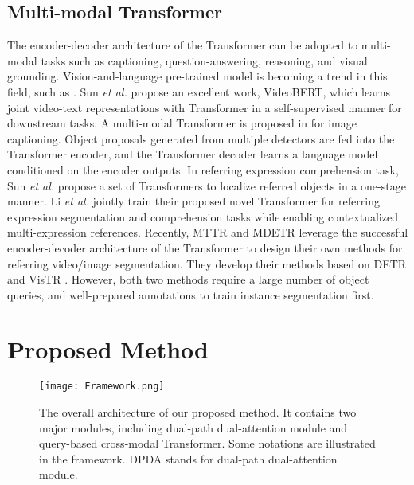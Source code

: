 \documentclass[sigconf]{acmart}
\begin{document}
\subsection{Multi-modal Transformer}

The encoder-decoder architecture of the Transformer can be adopted to multi-modal tasks such as captioning, question-answering, reasoning, and visual grounding. Vision-and-language pre-trained model is becoming a trend in this field, such as \cite{li2019visualbert, su2019vl, lu2019vilbert}.
Sun \textit{et al.} \cite{sun2019videobert} propose an excellent work, VideoBERT, which learns joint video-text representations with Transformer in a self-supervised manner for downstream tasks. A multi-modal Transformer is proposed in \cite{yu2019multimodal} for image captioning. Object proposals generated from multiple detectors are fed into the Transformer encoder, and the Transformer decoder learns a language model conditioned on the encoder outputs. In referring expression comprehension task, Sun \textit{et al.} \cite{suo2021proposal} propose a set of Transformers to localize referred objects in a one-stage manner. 
Li \textit{et al.} \cite{li2021referring} jointly train their proposed novel Transformer for referring expression segmentation and comprehension tasks while enabling contextualized multi-expression references. Recently, MTTR \cite{botach2021end} and MDETR \cite{kamath2021mdetr} leverage the successful encoder-decoder architecture of the Transformer to design their own methods for referring video/image segmentation. They develop their methods based on DETR \cite{carion2020end} and VisTR \cite{wang2021end}. However, both two methods require a large number of object queries, and well-prepared annotations to train instance segmentation first.


\section{Proposed Method}








\begin{figure*}[t]
\centering
\texttt{[image: Framework.png]}
\caption{The overall architecture of our proposed method. It contains two major modules, including dual-path dual-attention module and query-based cross-modal Transformer. Some notations are illustrated in the framework. DPDA stands for dual-path dual-attention module.}
\label{fig3_1}
\end{figure*}
\end{document}
